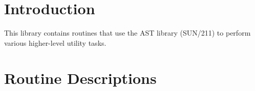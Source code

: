\documentclass[11pt,nolof]{starlink}
\begin{document}
\scfrontmatter

\section {Introduction}

This library contains routines that use the AST library (SUN/211) to perform various
higher-level utility tasks.

\appendix
\section{\label{APP:SPEC}Routine Descriptions}

\small
\end{document}
